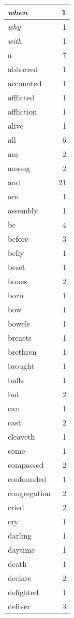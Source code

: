 \begin{center}
\begin{longtable}{l|r}
\emph{when} & 1 \\ \hline
\emph{why} & 1 \\ \hline
\emph{with} & 1 \\ \hline
a & 7 \\ \hline
abhorred & 1 \\ \hline
accounted & 1 \\ \hline
afflicted & 1 \\ \hline
affliction & 1 \\ \hline
alive & 1 \\ \hline
all & 6 \\ \hline
am & 2 \\ \hline
among & 2 \\ \hline
and & 21 \\ \hline
are & 1 \\ \hline
assembly & 1 \\ \hline
be & 4 \\ \hline
before & 3 \\ \hline
belly & 1 \\ \hline
beset & 1 \\ \hline
bones & 2 \\ \hline
born & 1 \\ \hline
bow & 1 \\ \hline
bowels & 1 \\ \hline
breasts & 1 \\ \hline
brethren & 1 \\ \hline
brought & 1 \\ \hline
bulls & 1 \\ \hline
but & 2 \\ \hline
can & 1 \\ \hline
cast & 2 \\ \hline
cleaveth & 1 \\ \hline
come & 1 \\ \hline
compassed & 2 \\ \hline
confounded & 1 \\ \hline
congregation & 2 \\ \hline
cried & 2 \\ \hline
cry & 1 \\ \hline
darling & 1 \\ \hline
daytime & 1 \\ \hline
death & 1 \\ \hline
declare & 2 \\ \hline
delighted & 1 \\ \hline
deliver & 3 \\ \hline

\end{longtable}
\end{center}
